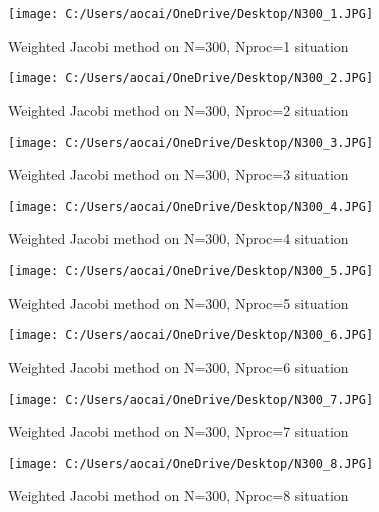 \documentclass[12pt]{article}
\begin{document}
\begin{figure}[H]
	\centering
	\texttt{[image: C:/Users/aocai/OneDrive/Desktop/N300\_1.JPG]}
	\caption[Optional caption]{Weighted Jacobi method on N=300, Nproc=1 situation}
	\label{fig:N3001}
\end{figure}
\begin{figure}[H]
	\centering
	\texttt{[image: C:/Users/aocai/OneDrive/Desktop/N300\_2.JPG]}
	\caption[Optional caption]{Weighted Jacobi method on N=300, Nproc=2 situation}
	\label{fig:N3002}
\end{figure}
\begin{figure}[H]
	\centering
	\texttt{[image: C:/Users/aocai/OneDrive/Desktop/N300\_3.JPG]}
	\caption[Optional caption]{Weighted Jacobi method on N=300, Nproc=3 situation}
	\label{fig:N3003}
\end{figure}
\begin{figure}[H]
	\centering
	\texttt{[image: C:/Users/aocai/OneDrive/Desktop/N300\_4.JPG]}
	\caption[Optional caption]{Weighted Jacobi method on N=300, Nproc=4 situation}
	\label{fig:N3004}
\end{figure}
\begin{figure}[H]
	\centering
	\texttt{[image: C:/Users/aocai/OneDrive/Desktop/N300\_5.JPG]}
	\caption[Optional caption]{Weighted Jacobi method on N=300, Nproc=5 situation}
	\label{fig:N3005}
\end{figure}
\begin{figure}[H]
	\centering
	\texttt{[image: C:/Users/aocai/OneDrive/Desktop/N300\_6.JPG]}
	\caption[Optional caption]{Weighted Jacobi method on N=300, Nproc=6 situation}
	\label{fig:N3006}
\end{figure}
\begin{figure}[H]
	\centering
	\texttt{[image: C:/Users/aocai/OneDrive/Desktop/N300\_7.JPG]}
	\caption[Optional caption]{Weighted Jacobi method on N=300, Nproc=7 situation}
	\label{fig:N3007}
\end{figure}
\begin{figure}[H]
	\centering
	\texttt{[image: C:/Users/aocai/OneDrive/Desktop/N300\_8.JPG]}
	\caption[Optional caption]{Weighted Jacobi method on N=300, Nproc=8 situation}
	\label{fig:N3008}
\end{figure}
\end{document}
